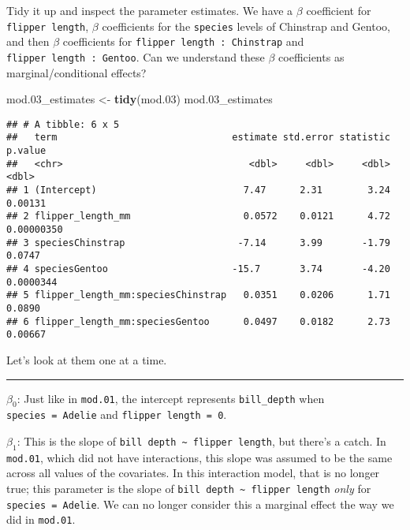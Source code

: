 \documentclass[
]{article}
\newenvironment{Shaded}{\begin{snugshade}}{\end{snugshade}}
\newcommand{\FloatTok}[1]{\textcolor[rgb]{0.00,0.00,0.81}{#1}}
\newcommand{\FunctionTok}[1]{\textcolor[rgb]{0.13,0.29,0.53}{\textbf{#1}}}
\newcommand{\NormalTok}[1]{#1}
\newcommand{\OtherTok}[1]{\textcolor[rgb]{0.56,0.35,0.01}{#1}}
\begin{document}
Tidy it up and inspect the parameter estimates. We have a \(\beta\)
coefficient for \texttt{flipper\ length}, \(\beta\) coefficients for the
\texttt{species} levels of Chinstrap and Gentoo, and then \(\beta\)
coefficients for \texttt{flipper\ length\ :\ Chinstrap} and
\texttt{flipper\ length\ :\ Gentoo}. Can we understand these \(\beta\)
coefficients as marginal/conditional effects?

\begin{Shaded}
\begin{Highlighting}[]
\NormalTok{mod}\FloatTok{.03}\NormalTok{\_estimates }\OtherTok{\textless{}{-}} \FunctionTok{tidy}\NormalTok{(mod}\FloatTok{.03}\NormalTok{)}
\NormalTok{mod}\FloatTok{.03}\NormalTok{\_estimates}
\end{Highlighting}
\end{Shaded}

\begin{verbatim}
## # A tibble: 6 x 5
##   term                               estimate std.error statistic    p.value
##   <chr>                                 <dbl>     <dbl>     <dbl>      <dbl>
## 1 (Intercept)                          7.47      2.31        3.24 0.00131   
## 2 flipper_length_mm                    0.0572    0.0121      4.72 0.00000350
## 3 speciesChinstrap                    -7.14      3.99       -1.79 0.0747    
## 4 speciesGentoo                      -15.7       3.74       -4.20 0.0000344 
## 5 flipper_length_mm:speciesChinstrap   0.0351    0.0206      1.71 0.0890    
## 6 flipper_length_mm:speciesGentoo      0.0497    0.0182      2.73 0.00667
\end{verbatim}

Let's look at them one at a time.

\begin{center}\rule{0.5\linewidth}{0.5pt}\end{center}

\(\beta_0\): Just like in \texttt{mod.01}, the intercept represents
\texttt{bill\_depth} when \texttt{species\ =\ Adelie} and
\texttt{flipper\ length\ =\ 0}.

\(\beta_1\): This is the slope of
\texttt{bill\ depth\ \textasciitilde{}\ flipper\ length}, but there's a
catch. In \texttt{mod.01}, which did not have interactions, this slope
was assumed to be the same across all values of the covariates. In this
interaction model, that is no longer true; this parameter is the slope
of \texttt{bill\ depth\ \textasciitilde{}\ flipper\ length} \emph{only}
for \texttt{species\ =\ Adelie}. We can no longer consider this a
marginal effect the way we did in \texttt{mod.01}.
\end{document}
